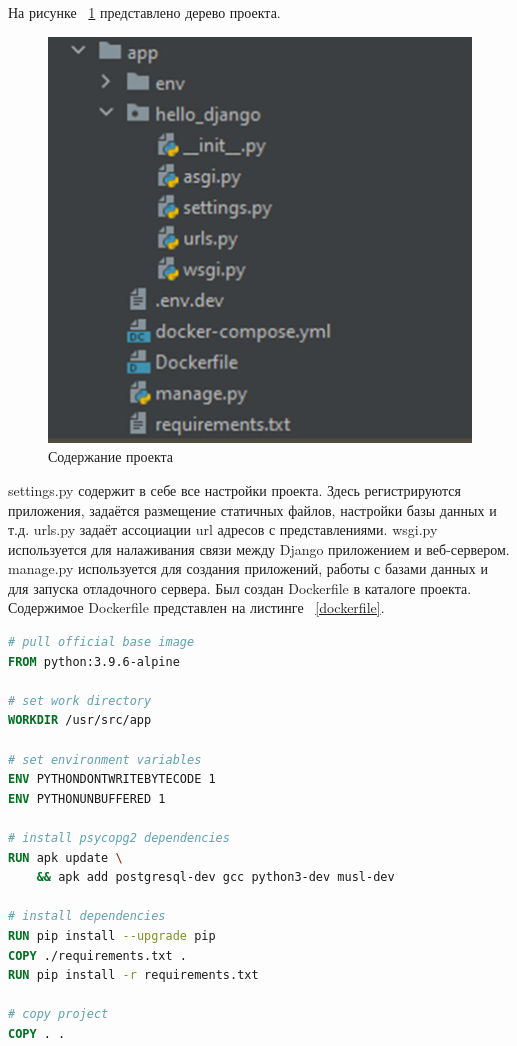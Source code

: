 \def\notedate{2022.10.29}
\def\currentauthor{Василян А.Р. (РК6-73Б)}

На рисунке ~\ref{picture1} представлено дерево проекта.
\begin{figure}[!ht]
  \centering
  \includegraphics[scale=0.35]{ResearchNotes/rndhpc_not_gui_2022_10_29/picture1.png}
  \caption{Содержание проекта}
  \label{picture1}
\end{figure}

	\textsf{settings.py} содержит в себе все настройки проекта. Здесь регистрируются приложения, задаётся размещение статичных файлов, настройки базы данных и т.д. 
	\textsf{urls.py} задаёт ассоциации url адресов с представлениями. 
	\textsf{wsgi.py} используется для налаживания связи между Django приложением и веб-сервером.
	\textsf{manage.py} используется для создания приложений, работы с базами данных и для запуска отладочного сервера.
	Был создан \textsf{Dockerfile} в каталоге проекта. Содержимое \textsf{Dockerfile} представлен на листинге ~\ref{dockerfile}.

\begin{lstlisting}[frame=single, label={dockerfile}, caption={\textsf{Dockerfile}}, language=Dockerfile] 
# pull official base image
FROM python:3.9.6-alpine

# set work directory
WORKDIR /usr/src/app

# set environment variables
ENV PYTHONDONTWRITEBYTECODE 1
ENV PYTHONUNBUFFERED 1

# install psycopg2 dependencies
RUN apk update \
    && apk add postgresql-dev gcc python3-dev musl-dev

# install dependencies
RUN pip install --upgrade pip
COPY ./requirements.txt .
RUN pip install -r requirements.txt

# copy project
COPY . .
\end{lstlisting}

